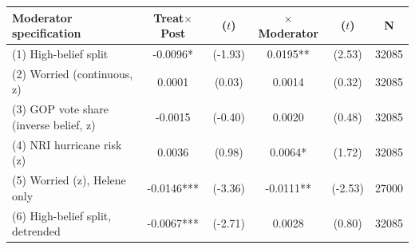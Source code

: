 \begin{tabular}{lccccc}
\toprule
Moderator specification & Treat$\times$Post & ($t$) & $\times$Moderator & ($t$) & N \\
\midrule
(1) High-belief split & -0.0096* & (-1.93) & 0.0195** & (2.53) & 32085 \\
(2) Worried (continuous, z) & 0.0001 & (0.03) & 0.0014 & (0.32) & 32085 \\
(3) GOP vote share (inverse belief, z) & -0.0015 & (-0.40) & 0.0020 & (0.48) & 32085 \\
(4) NRI hurricane risk (z) & 0.0036 & (0.98) & 0.0064* & (1.72) & 32085 \\
(5) Worried (z), Helene only & -0.0146*** & (-3.36) & -0.0111** & (-2.53) & 27000 \\
(6) High-belief split, detrended & -0.0067*** & (-2.71) & 0.0028 & (0.80) & 32085 \\
\bottomrule
\end{tabular}